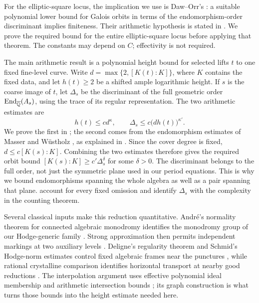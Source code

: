 For the elliptic-square locus, the implication we use is Daw--Orr's
\cite[Theorem~1.3]{DawOrr2022}: a suitable polynomial lower bound for
Galois orbits in terms of the endomorphism-order discriminant implies
finiteness. Their arithmetic hypothesis is stated in
\cite[Conjecture~6.2]{DawOrr2022}. We prove the required bound for the
entire elliptic-square locus before applying that theorem. The constants
may depend on $C$; effectivity is not required.

The main arithmetic result is a polynomial height bound for selected
lifts $t$ to one fixed fine-level curve. Write
$d=\max\{2,[K(t):K]\}$, where $K$ contains the fixed data, and let
$h(t)\geq2$ be a shifted ample logarithmic height. If $s$ is the coarse
image of $t$, let $\Delta_s$ be the discriminant of the full geometric
order $\operatorname{End}_{\overline{\mathbb Q}}(A_s)$, using the trace of its regular representation.
The two arithmetic estimates are
\[
 h(t)\leq c d^{\kappa},\qquad
 \Delta_s\leq c\bigl(dh(t)\bigr)^{\kappa'}.
\]
We prove the first in ; the second comes from the
endomorphism estimates of Masser and W\"ustholz
\cite{MasserWustholz1994}, as explained in .
Since the cover degree is fixed, $d\leq c[K(s):K]$. Combining the two
estimates therefore gives the required orbit bound
$[K(s):K]\geq c'\Delta_s^{\delta}$ for some $\delta>0$.
The discriminant belongs to the full order, not just the symmetric plane
used in our period equations. This is why we bound endomorphisms spanning
the whole algebra as well as a pair spanning that plane.
 account for every fixed omission and identify
$\Delta_s$ with the complexity in the counting theorem.

Several classical inputs make this reduction quantitative. Andr\'e's
normality theorem for connected algebraic monodromy identifies the
monodromy group of our Hodge-generic family
\cite[\S5, Theorem~1]{Andre1992}. Strong approximation then permits
independent markings at two auxiliary levels \cite{MVW1984}.
Deligne's regularity theorem and Schmid's Hodge-norm estimates control
fixed algebraic frames near the punctures
\cite{Deligne1970,Schmid1973}, while rational crystalline comparison
identifies horizontal transport at nearby good reductions
\cite{BerthelotOgus1983,Berthelot1982}. The interpolation argument uses
effective polynomial ideal membership and arithmetic intersection
bounds \cite{Hermann1926,Dube1990,Aschenbrenner2004,KrickPardoSombra2001};
its graph construction is what turns those bounds into the height
estimate needed here.

